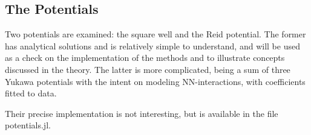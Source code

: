 \subsection{The Potentials}

Two potentials are examined: the square well and the Reid potential. The former
has analytical solutions and is relatively simple to understand, and will be
used as a check on the implementation of the methods and to illustrate concepts
discussed in the theory. The latter is more complicated, being a sum of three
Yukawa potentials with the intent on modeling NN-interactions, with coefficients
fitted to data. 

Their precise implementation is not interesting, but is available in the file
\textsf{potentials.jl}. 


